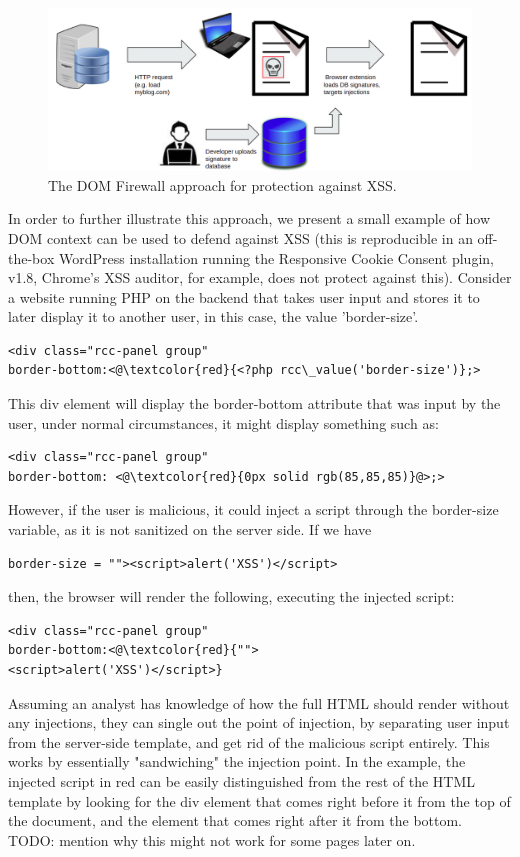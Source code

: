  \begin{figure}[h]
 	\includegraphics[scale=0.23]{img/dom_firewall.png}
 	\caption{The DOM Firewall approach for protection against XSS.}
 	\label{fig:dom_firewall}
 \end{figure}

In order to further illustrate this approach, we present a small example of how DOM context can be used to defend against XSS (this is reproducible in an off-the-box WordPress installation running the Responsive Cookie Consent plugin, v1.8, Chrome's XSS auditor, for example, does not protect against this). Consider a website running PHP on the backend that takes user input and stores it to later display it to another user, in this case, the value 'border-size'.
\\
\begin{lstlisting}
<div class="rcc-panel group" 
border-bottom:<@\textcolor{red}{<?php rcc\_value('border-size')};>
\end{lstlisting}
This div element will display the border-bottom attribute that was input by the user, under normal circumstances, it might display something such as: 
\begin{lstlisting}
<div class="rcc-panel group" 
border-bottom: <@\textcolor{red}{0px solid rgb(85,85,85)}@>;>
\end{lstlisting}
However, if the user is malicious, it could inject a script through the border-size variable, as it is not sanitized on the server side. If we have
\begin{lstlisting}
border-size = ""><script>alert('XSS')</script>
\end{lstlisting}
then, the browser will render the following, executing the injected script:
\begin{lstlisting}
<div class="rcc-panel group" 
border-bottom:<@\textcolor{red}{"">
<script>alert('XSS')</script>}
\end{lstlisting}

Assuming an analyst has knowledge of how the full HTML should render without any injections, they can single out the point of injection, by separating user input from the server-side template, and get rid of the malicious script entirely. This works by essentially "sandwiching" the injection point. In the example, the injected script in red can be easily distinguished from the rest of the HTML template by looking for the div element that comes right before it from the top of the document, and the element that comes right after it from the bottom. TODO: mention why this might not work for some pages later on.

